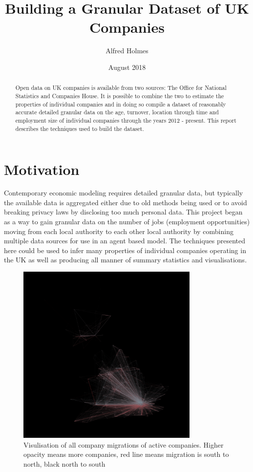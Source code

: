 \documentclass[a4paper,10pt]{article}
\title{Building a Granular Dataset of UK Companies}
\author{Alfred Holmes}
\date{August 2018}
\begin{document}
\maketitle

\begin{abstract}
    Open data on UK companies is available from two sources: The Office for National Statistics and Companies House. It is possible to combine the two to estimate the properties of individual companies and in doing so compile a dataset of reasonably accurate detailed granular data on the age, turnover, location through time and employment size of individual companies through the years 2012 - present. This report describes the techniques used to build the dataset.
\end{abstract}
\section*{Motivation}
Contemporary economic modeling requires detailed granular data, but typically the available data is aggregated either due to old methods being used or to avoid breaking privacy laws by disclosing too much personal data. This project began as a way to gain granular data on the number of jobs (employment opportunities) moving from each local authority to each other local authority by combining multiple data sources for use in an agent based model. The techniques presented here could be used to infer many properties of individual companies operating in the UK as well as producing all manner of summary statistics and visualisations.
\begin{figure}[ht]
 \includegraphics[width=340px]{graphics/visulisation}
 \caption{Visulisation of all company migrations of active companies. Higher opacity means more companies, red line means migration is south to north, black north to south}
\end{figure}
\end{document}
